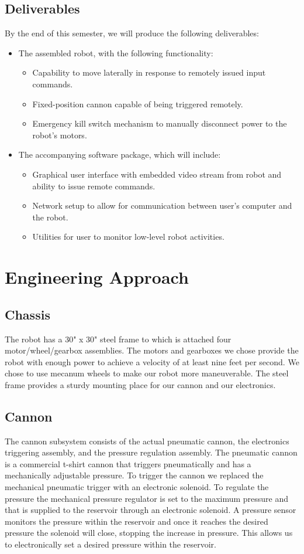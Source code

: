 \documentclass[letterpaper,12pt]{article}
\begin{document}
\subsection{Deliverables}
By the end of this semester, we will produce the following deliverables:
\begin{itemize}
\item The assembled robot, with the following functionality:
  \begin{itemize}
  \item Capability to move laterally in response to remotely issued input commands.
  \item Fixed-position cannon capable of being triggered remotely.
  \item Emergency kill switch mechanism to manually disconnect power to the robot's motors.
  \end{itemize}
\item The accompanying software package, which will include:
  \begin{itemize}
  \item Graphical user interface with embedded video stream from robot and ability to issue remote commands.
  \item Network setup to allow for communication between user's computer and the robot.
  \item Utilities for user to monitor low-level robot activities.
  \end{itemize}
\end{itemize}

\section{Engineering Approach}
\subsection{Chassis}
The robot has a 30" x 30" steel frame to which is attached four motor/wheel/gearbox assemblies. The motors and gearboxes we chose provide the robot with enough power to achieve a velocity of at least nine feet per second. We chose to use mecanum wheels to make our robot more maneuverable. The steel frame provides a sturdy mounting place for our cannon and our electronics.
\subsection{Cannon}
The cannon subsystem consists of the actual pneumatic cannon, the electronics triggering assembly, and the pressure regulation assembly. The pneumatic cannon is a commercial t-shirt cannon that triggers pneumatically and has a mechanically adjustable pressure. To trigger the cannon we replaced the mechanical pneumatic trigger with an electronic solenoid. To regulate the pressure the mechanical pressure regulator is set to the maximum pressure and that is supplied to the reservoir through an electronic solenoid. A pressure sensor monitors the pressure within the reservoir and once it reaches the desired pressure the solenoid will close, stopping the increase in pressure. This allows us to electronically set a desired pressure within the reservoir.
\end{document}
